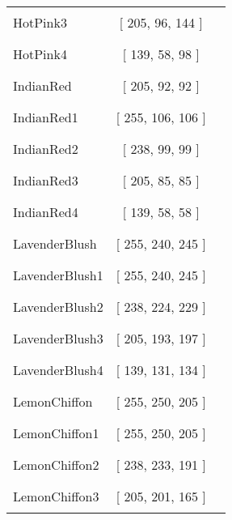 \begin{tabular}{|l|c|c|}
HotPink3 & [ 205, 96, 144 ] & \color{HotPink3} \rule{1cm}{1.5ex}\\
HotPink4 & [ 139, 58, 98 ] & \color{HotPink4} \rule{1cm}{1.5ex}\\
IndianRed & [ 205, 92, 92 ] & \color{IndianRed} \rule{1cm}{1.5ex}\\
IndianRed1 & [ 255, 106, 106 ] & \color{IndianRed1} \rule{1cm}{1.5ex}\\
IndianRed2 & [ 238, 99, 99 ] & \color{IndianRed2} \rule{1cm}{1.5ex}\\
IndianRed3 & [ 205, 85, 85 ] & \color{IndianRed3} \rule{1cm}{1.5ex}\\
IndianRed4 & [ 139, 58, 58 ] & \color{IndianRed4} \rule{1cm}{1.5ex}\\
LavenderBlush & [ 255, 240, 245 ] & \color{LavenderBlush} \rule{1cm}{1.5ex}\\
LavenderBlush1 & [ 255, 240, 245 ] & \color{LavenderBlush1} \rule{1cm}{1.5ex}\\
LavenderBlush2 & [ 238, 224, 229 ] & \color{LavenderBlush2} \rule{1cm}{1.5ex}\\
LavenderBlush3 & [ 205, 193, 197 ] & \color{LavenderBlush3} \rule{1cm}{1.5ex}\\
LavenderBlush4 & [ 139, 131, 134 ] & \color{LavenderBlush4} \rule{1cm}{1.5ex}\\
LemonChiffon & [ 255, 250, 205 ] & \color{LemonChiffon} \rule{1cm}{1.5ex}\\
LemonChiffon1 & [ 255, 250, 205 ] & \color{LemonChiffon1} \rule{1cm}{1.5ex}\\
LemonChiffon2 & [ 238, 233, 191 ] & \color{LemonChiffon2} \rule{1cm}{1.5ex}\\
LemonChiffon3 & [ 205, 201, 165 ] & \color{LemonChiffon3} \rule{1cm}{1.5ex}\\
\end{tabular}


